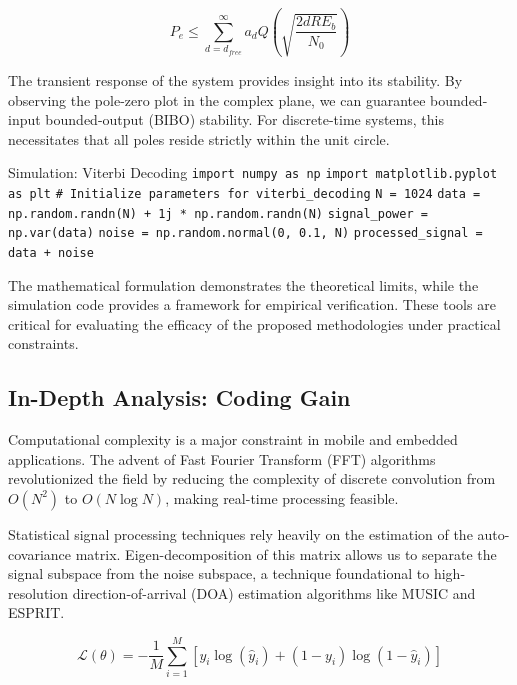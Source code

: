 \begin{equation}
    P_e \leq \sum_{d=d_{free}}^{\infty} a_d Q\left(\sqrt{\frac{2 d R E_b}{N_0}}\right)
\end{equation}

The transient response of the system provides insight into its stability. By observing the pole-zero plot in the complex plane, we can guarantee bounded-input bounded-output (BIBO) stability. For discrete-time systems, this necessitates that all poles reside strictly within the unit circle.

\begin{pythonbox}{Simulation: Viterbi Decoding}
\texttt{import numpy as np}
\texttt{import matplotlib.pyplot as plt}
\texttt{}
\texttt{\# Initialize parameters for viterbi\_decoding}
\texttt{N = 1024}
\texttt{data = np.random.randn(N) + 1j * np.random.randn(N)}
\texttt{signal\_power = np.var(data)}
\texttt{noise = np.random.normal(0, 0.1, N)}
\texttt{processed\_signal = data + noise}
\end{pythonbox}

\vspace{0.5cm}
The mathematical formulation demonstrates the theoretical limits, while the simulation code provides a framework for empirical verification. These tools are critical for evaluating the efficacy of the proposed methodologies under practical constraints.


\subsection{In-Depth Analysis: Coding Gain}
Computational complexity is a major constraint in mobile and embedded applications. The advent of Fast Fourier Transform (FFT) algorithms revolutionized the field by reducing the complexity of discrete convolution from $O(N^2)$ to $O(N \log N)$, making real-time processing feasible.

Statistical signal processing techniques rely heavily on the estimation of the auto-covariance matrix. Eigen-decomposition of this matrix allows us to separate the signal subspace from the noise subspace, a technique foundational to high-resolution direction-of-arrival (DOA) estimation algorithms like MUSIC and ESPRIT.

\begin{equation}
    \mathcal{L}(\theta) = -\frac{1}{M} \sum_{i=1}^{M} \left[ y_i \log(\hat{y}_i) + (1-y_i)\log(1-\hat{y}_i) \right]
\end{equation}

